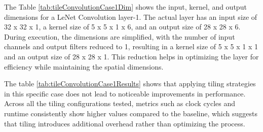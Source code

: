 The Table \ref{tab:tileConvolutionCase1Dim} shows the input, kernel, and output dimensions for a LeNet Convolution layer-1. The actual layer has an input size of 32 x 32 x 1, a kernel size of 5 x 5 x 1 x 6, and an output size of 28 x 28 x 6. During execution, the dimensions are simplified, with the number of input channels and output filters reduced to 1, resulting in a kernel size of 5 x 5 x 1 x 1 and an output size of 28 x 28 x 1. This reduction helps in optimizing the layer for efficiency while maintaining the spatial dimensions.


\begin{table}[H]
\centering
\caption{Loop tiling results}
\label{tab:tileConvolutionCase1Results}
\end{table}

The table \ref{tab:tileConvolutionCase1Results} shows that applying tiling strategies in this specific case does not lead to noticeable improvements in performance. Across all the tiling configurations tested, metrics such as clock cycles and runtime consistently show higher values compared to the baseline, which suggests that tiling introduces additional overhead rather than optimizing the process.

